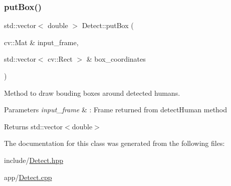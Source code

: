 \subsubsection{\texorpdfstring{put\+Box()}{putBox()}}
{\footnotesize\ttfamily std\+::vector$<$ double $>$ Detect\+::put\+Box (\begin{DoxyParamCaption}\item[{cv\+::\+Mat \&}]{input\+\_\+frame,  }\item[{std\+::vector$<$ cv\+::\+Rect $>$ \&}]{box\+\_\+coordinates }\end{DoxyParamCaption})}



Method to draw bouding boxes around detected humans. 


\begin{DoxyParams}{Parameters}
{\em input\+\_\+frame} & \+: Frame returned from detect\+Human method \\
\hline
\end{DoxyParams}
\begin{DoxyReturn}{Returns}
std\+::vector$<$double$>$ 
\end{DoxyReturn}


The documentation for this class was generated from the following files\+:\begin{DoxyCompactItemize}
\item 
include/\hyperlink{Detect_8hpp}{Detect.\+hpp}\item 
app/\hyperlink{Detect_8cpp}{Detect.\+cpp}\end{DoxyCompactItemize}
